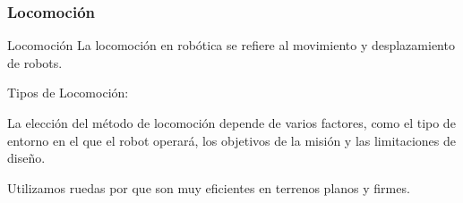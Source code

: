 \begin{frame}
    \frametitle{Locomoción}
    \footnotesize

    \begin{block}{Locomoción}
        La locomoción en robótica se refiere al movimiento y desplazamiento de robots. 
    \end{block}
    
    Tipos de Locomoción:
    
    
    

    La elección del método de locomoción depende de varios factores, como el tipo de entorno en el que el robot operará, los objetivos de la misión y las limitaciones de diseño. 

    Utilizamos ruedas por que son muy eficientes en terrenos planos y firmes.
\end{frame}



